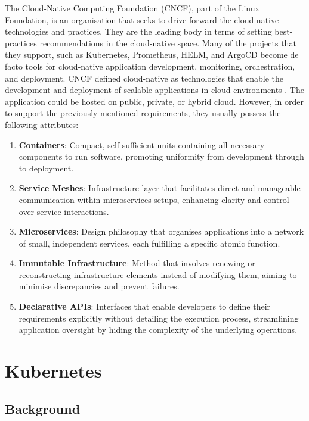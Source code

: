 The Cloud-Native Computing Foundation (CNCF), part of the Linux Foundation, is an organisation that seeks to drive forward the cloud-native technologies and practices. They are the leading body in terms of setting best-practices recommendations in the cloud-native space. Many of the projects that they support, such as Kubernetes, Prometheus, HELM, and ArgoCD become de facto tools for cloud-native application development, monitoring, orchestration, and deployment. CNCF defined cloud-native as technologies that enable the development and deployment of scalable applications in cloud environments \cite{cloudnativecomputingfoundationWhoWeAre}. The application could be hosted on public, private, or hybrid cloud. However, in order to support the previously mentioned requirements, they usually possess the following attributes:

\begin{enumerate}
\item
  \textbf{Containers}: Compact, self-sufficient units containing all necessary components to run software, promoting uniformity from development through to deployment.
\item
  \textbf{Service Meshes}: Infrastructure layer that facilitates direct and manageable communication within microservices setups, enhancing clarity and control over service interactions.
\item
  \textbf{Microservices}: Design philosophy that organises applications into a network of small, independent services, each fulfilling a specific atomic function.
\item
  \textbf{Immutable Infrastructure}: Method that involves renewing or reconstructing infrastructure elements instead of modifying them, aiming to minimise discrepancies and prevent failures.
\item
  \textbf{Declarative APIs}: Interfaces that enable developers to define their requirements explicitly without detailing the execution process, streamlining application oversight by hiding the complexity of the underlying operations.
\end{enumerate}

\section{Kubernetes}\label{kubernetes}
\subsection{Background}

